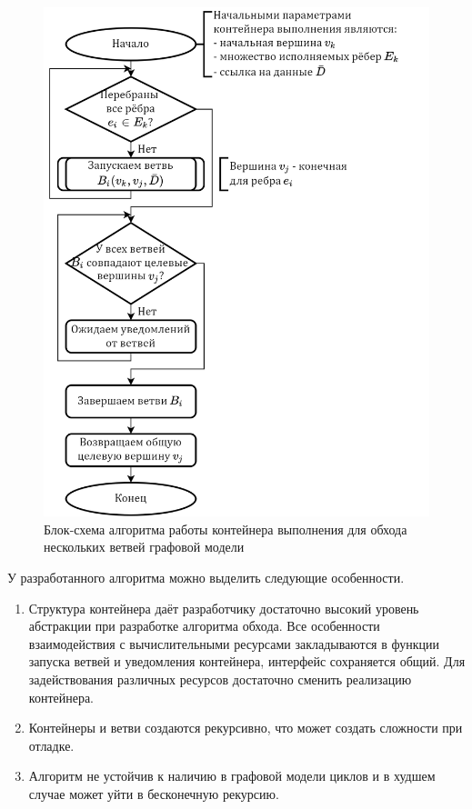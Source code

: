 \begin{figure}[H]
	\centering
	\includegraphics[height=0.6\textheight]{ResearchNotes/rndhpc_not_par_2022_01_22/flowchart.executionContainer.png}
	\caption{Блок-схема алгоритма работы контейнера выполнения для обхода нескольких ветвей графовой модели}
	\label{fig:comsdk_container}
\end{figure}

У разработанного алгоритма можно выделить следующие особенности.
\begin{enumerate}
	\item Структура контейнера даёт разработчику достаточно высокий уровень абстракции при разработке алгоритма обхода. Все особенности взаимодействия с вычислительными ресурсами закладываются в функции запуска ветвей и уведомления контейнера, интерфейс сохраняется общий. Для задействования различных ресурсов достаточно сменить реализацию контейнера.
	\item Контейнеры и ветви создаются рекурсивно, что может создать сложности при отладке.
	\item Алгоритм не устойчив к наличию в графовой модели циклов и в худшем случае может уйти в бесконечную рекурсию.
\end{enumerate}
\noteattributes{}
